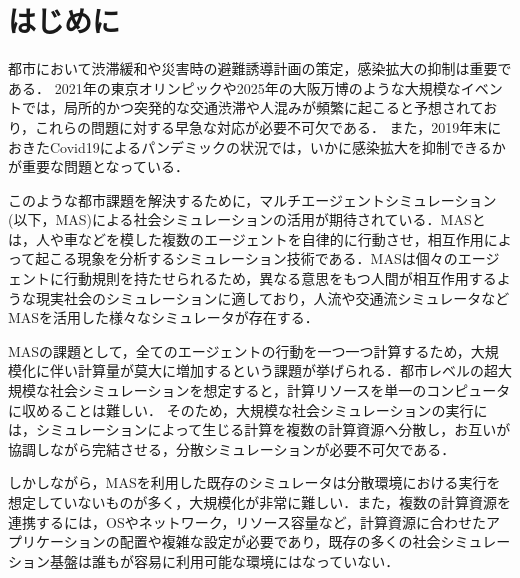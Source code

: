 \documentclass[originalpaper]{jsaiart}     %
\author{%
 \name{平野}{流}{Rui Hirano}
 \affiliation{名古屋大学大学院工学研究科}%
     {Graduate School of Engineering, Nagoya University}%
     {ruirui@ucl.nuee.nagoya-u.ac.jp, https://ruihirano.github.io}
\and
 \name{青木}{俊介}{Aoki Shunsuke}
 \sameaffiliation{shunsuke@nagoya-u.jp}
\and
 \name{米澤}{拓郎}{Takuro Yonezawa}
 \sameaffiliation{takuro@nagoya-u.jp}
\and
 \name{河口}{信夫}{Nobuo Kawaguchi}
 \affiliation{名古屋大学大学院工学研究科, 名古屋大学未来社会創造機構}%
     {Graduate School of Engineering, Nagoya University and Institutes of Innovation for Fu- ture Society, Nagoya University}%
     {kawaguti@nagoya-u.jp}
}
\begin{document}
\maketitle

\section{はじめに} %
都市において渋滞緩和や災害時の避難誘導計画の策定，感染拡大の抑制は重要である．
2021年の東京オリンピックや2025年の大阪万博のような大規模なイベントでは，局所的かつ突発的な交通渋滞や人混みが頻繁に起こると予想されており，これらの問題に対する早急な対応が必要不可欠である．
また，2019年末におきたCovid19によるパンデミックの状況では，いかに感染拡大を抑制できるかが重要な問題となっている．

このような都市課題を解決するために，マルチエージェントシミュレーション(以下，MAS)\cite{Zargayouna}による社会シミュレーションの活用が期待されている．MASとは，人や車などを模した複数のエージェントを自律的に行動させ，相互作用によって起こる現象を分析するシミュレーション技術である．MASは個々のエージェントに行動規則を持たせられるため，異なる意思をもつ人間が相互作用するような現実社会のシミュレーションに適しており，人流や交通流シミュレータなどMASを活用した様々なシミュレータが存在する．




MASの課題として，全てのエージェントの行動を一つ一つ計算するため，大規模化に伴い計算量が莫大に増加するという課題が挙げられる．都市レベルの超大規模な社会シミュレーションを想定すると，計算リソースを単一のコンピュータに収めることは難しい．
そのため，大規模な社会シミュレーションの実行には，シミュレーションによって生じる計算を複数の計算資源へ分散し，お互いが協調しながら完結させる，分散シミュレーションが必要不可欠である．

しかしながら，MASを利用した既存のシミュレータは分散環境における実行を想定していないものが多く，大規模化が非常に難しい．また，複数の計算資源を連携するには，OSやネットワーク，リソース容量など，計算資源に合わせたアプリケーションの配置や複雑な設定が必要であり，既存の多くの社会シミュレーション基盤は誰もが容易に利用可能な環境にはなっていない．
\end{document}

